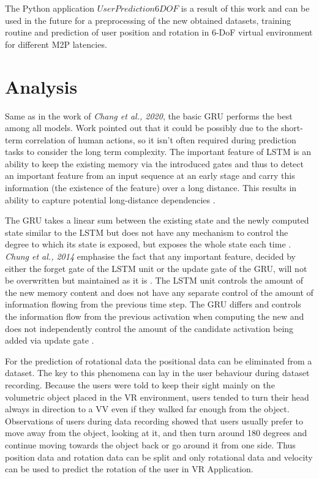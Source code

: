 The Python application $UserPrediction6DOF$ is a result of this work and can be used in the future for a preprocessing of the new obtained datasets, training routine and prediction of user position and rotation in 6-DoF virtual environment for different M2P latencies. 

\section{Analysis}
\label{sec:conclusion:analysis}
Same as in the work of \textit{Chang et al., 2020}, the basic GRU performs the best among all models. Work \cite{6DoF_Tracking} pointed out that it could be possibly due to the short-term correlation of human actions, so it isn’t often required during prediction tasks to consider the long term complexity. The important feature of LSTM is an ability to keep the existing memory via the introduced gates and thus to detect an important feature from an input sequence at an early stage and carry this information (the existence of the feature) over a long distance. This results in ability to capture potential long-distance dependencies \cite{empirical_evaluation}. 

The GRU takes a linear sum between the existing state and the newly computed state similar to the LSTM but does not have any mechanism to control the degree to which its state is exposed, but exposes the whole state each time \cite{empirical_evaluation}. \textit{Chung et al., 2014} emphasise the fact that any important feature, decided by either the forget gate of the LSTM unit or the update gate of the GRU, will not be overwritten but maintained as it is \cite{empirical_evaluation}. The LSTM unit controls the amount of the new memory content and does not have any separate control of the amount of information flowing from the previous time step. The GRU differs and controls the information flow from the previous activation when computing the new and does not independently control the amount of the candidate activation being added via update gate \cite{empirical_evaluation}. 

For the prediction of rotational data the positional data can be eliminated from a dataset. The key to this phenomena can lay in the user behaviour during dataset recording. Because the users were told to keep their sight mainly on the volumetric object placed in the VR environment, users tended to turn their head always in direction to a VV even if they walked far enough from the object. Observations of users during data recording showed that users usually prefer to move away from the object, looking at it, and then turn around 180 degrees and continue moving towards the object back or go around it from one side. Thus position data and rotation data can be split and only rotational data and velocity can be used to predict the rotation of the user in VR Application.

